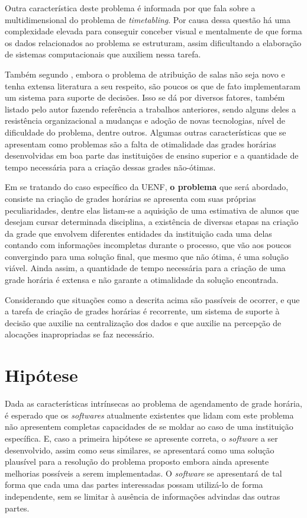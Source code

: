 Outra característica deste problema é informada por  que fala sobre a multidimensional do problema de \textit{timetabling}. Por causa dessa questão há uma complexidade elevada para conseguir conceber visual e mentalmente de que forma os dados relacionados ao problema se estruturam, assim dificultando a elaboração de sistemas computacionais que auxiliem nessa tarefa.

Também segundo , embora o problema de atribuição de salas não seja novo e tenha extensa literatura a seu respeito, são poucos os que de fato implementaram um sistema para suporte de decisões. Isso se dá por diversos fatores, também listado pelo autor fazendo referência a trabalhos anteriores, sendo alguns deles a resistência organizacional a mudanças e adoção de novas tecnologias, nível de dificuldade do problema, dentre outros. Algumas outras características que se apresentam como problemas são a falta de otimalidade das grades horárias desenvolvidas em boa parte das instituições de ensino superior e a quantidade de tempo necessária para a criação dessas grades não-ótimas.

Em se tratando do caso específico da UENF, \textbf{o problema} que será abordado, consiste na criação de grades horárias se apresenta com suas próprias peculiaridades, dentre elas listam-se a aquisição de uma estimativa de alunos que desejam cursar determinada disciplina, a existência de diversas etapas na criação da grade que envolvem diferentes entidades da instituição cada uma delas contando com informações incompletas durante o processo, que vão aos poucos convergindo para uma solução final, que mesmo que não ótima, é uma solução viável. Ainda assim, a quantidade de tempo necessária para a criação de uma grade horária é extensa e não garante a otimalidade da solução encontrada.

Considerando que situações como a descrita acima são passíveis de ocorrer, e que a tarefa de criação de grades horárias é recorrente, um sistema de suporte à decisão que auxilie na centralização dos dados e que auxilie na percepção de alocações inapropriadas se faz necessário.

\section{Hipótese} \label{sec:Hipótese}                  %

Dada as características intrínsecas ao problema de agendamento de grade horária, é esperado que os \textit{softwares} atualmente existentes que lidam com este problema não apresentem completas capacidades de se moldar ao caso de uma instituição específica. E, caso a primeira hipótese se apresente correta, o \textit{software} a ser desenvolvido, assim como seus similares, se apresentará como uma solução plausível para a resolução do problema proposto embora ainda apresente melhorias possíveis a serem implementadas. O \textit{software} se apresentará de tal forma que cada uma das partes interessadas possam utilizá-lo de forma independente, sem se limitar à ausência de informações advindas das outras partes.

